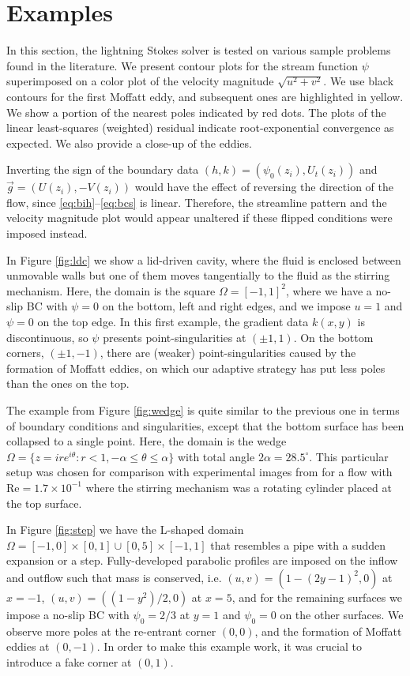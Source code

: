 
\section{Examples \label{sec:results}}
In this section, the lightning Stokes solver is tested on various sample problems found in the literature. We present contour plots for the stream function $\psi$ superimposed on a color plot of the velocity magnitude $\sqrt{u^2+v^2}$. We use black contours for the first Moffatt eddy, and subsequent ones are highlighted in yellow. We show a portion of the nearest poles indicated by red dots. The plots of the linear least-squares (weighted) residual indicate root-exponential convergence as expected. We also provide a close-up of the eddies.

Inverting the sign of the boundary data $(h,k)=(\psi_0(z_i), U_t(z_i))$ and $\vec{g}=(U(z_i), -V(z_i))$ would have the effect of reversing the direction of the flow, since \eqref{eq:bih}--\eqref{eq:bcs} is linear. Therefore, the streamline pattern and the velocity magnitude plot would appear unaltered if these flipped conditions were imposed instead.   

In Figure \ref{fig:ldc} we show a lid-driven cavity, where the fluid is enclosed between unmovable walls but one of them moves tangentially to the fluid as the stirring mechanism. Here, the domain is the square $\Omega=[-1,1]^2$, where we have a no-slip BC with $\psi=0$ on the bottom, left and right edges, and we impose $u=1$ and $\psi=0$ on the top edge. In this first example, the gradient data $k(x,y)$ is discontinuous, so $\psi$ presents point-singularities at $(\pm 1, 1)$. On the bottom corners, $(\pm 1,-1)$, there are (weaker) point-singularities caused by the formation of Moffatt eddies, on which our adaptive strategy has put less poles than the ones on the top.

The example from Figure \ref{fig:wedge} is quite similar to the previous one in terms of boundary conditions and singularities, except that the bottom surface has been collapsed to a single point. Here, the domain is the wedge $\Omega = \{z= i r e^{i\theta}: r<1, -\alpha \leq \theta\leq \alpha\}$ with total angle $2\alpha = 28.5^\circ$. This particular setup was chosen for comparison with experimental images from \cite{taneda79} for a flow with $\text{Re}=1.7\times10^{-1}$ where the stirring mechanism was a rotating cylinder placed at the top surface.

In Figure \ref{fig:step} we have the L-shaped domain $\Omega = [-1,0] \times [0,1] \cup [0,5]\times[-1,1]$ that resembles a pipe with a sudden expansion or a step. Fully-developed parabolic profiles are imposed on the inflow and outflow such that mass is conserved, i.e. $(u,v)=(1-(2y-1)^2,0)$ at $x=-1$, $(u,v)=((1-y^2)/2,0)$ at $x=5$, and for the remaining surfaces we impose a no-slip BC with $\psi_0=2/3$ at $y=1$ and $\psi_0=0$ on the other surfaces. We observe more poles at the re-entrant corner $(0,0)$, and the formation of Moffatt eddies at $(0,-1)$. In order to make this example work, it was crucial to introduce a fake corner at $(0,1)$.

